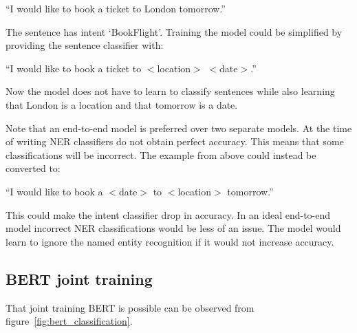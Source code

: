 \begin{center}
    ``I would like to book a ticket to London tomorrow.''
\end{center}

The sentence has intent `BookFlight'.
Training the model could be simplified by providing the sentence classifier with:

\begin{center}
    ``I would like to book a ticket to $<$location$>$ $<$date$>$.''
\end{center}

Now the model does not have to learn to classify sentences while also learning that London is a location and that tomorrow is a date.

Note that an end-to-end model is preferred over two separate models.
At the time of writing NER classifiers do not obtain perfect accuracy.
This means that some classifications will be incorrect.
The example from above could instead be converted to:

\begin{center}
    ``I would like to book a $<$date$>$ to $<$location$>$ tomorrow.''
\end{center}

This could make the intent classifier drop in accuracy.
In an ideal end-to-end model incorrect NER classifications would be less of an issue.
The model would learn to ignore the named entity recognition if it would not increase accuracy.

\subsection{BERT joint training}
\label{subsec:bert_joint_training}
That joint training BERT is possible can be observed from figure~\ref{fig:bert_classification}.

